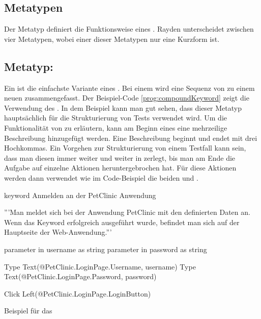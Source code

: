 
\subsection{Metatypen}

Der Metatyp definiert die Funktionsweise eines . Rayden unterscheidet zwischen vier Metatypen, wobei einer dieser Metatypen nur eine Kurzform ist.


\subsection{Metatyp: }

Ein  ist die einfachste Variante eines . Bei einem  wird eine Sequenz von  zu einem neuen  zusammengefasst. Der Beispiel-Code \ref{prog:compoundKeyword} zeigt die Verwendung des  . In dem Beispiel kann man gut sehen, dass dieser Metatyp hauptsächlich für die Strukturierung von Tests verwendet wird. Um die Funktionalität von  zu erläutern, kann am Beginn eines  eine mehrzeilige Beschreibung hinzugefügt werden. Eine Beschreibung beginnt und endet mit drei Hochkommas. Ein Vorgehen zur Strukturierung von einem Testfall kann sein, dass man diesen immer weiter und weiter in  zerlegt, bis man am Ende die Aufgabe auf einzelne Aktionen heruntergebrochen hat. Für diese Aktionen werden dann  verwendet wie im Code-Beispiel die beiden   und .

\begin{program}
\begin{JavaCode}
keyword Anmelden an der PetClinic Anwendung {
	'''Man meldet sich bei der Anwendung PetClinic mit den definierten 
	   Daten an. Wenn das Keyword erfolgreich ausgeführt wurde, 
	   befindet man sich auf der Hauptseite der Web-Anwendung.'''
	
	parameter in username as string
	parameter in password as string
	
	Type Text(@PetClinic.LoginPage.Username, username)
	Type Text(@PetClinic.LoginPage.Password, password)
	
	Click Left(@PetClinic.LoginPage.LoginButton)
}
\end{JavaCode}
\caption{Beispiel für das  }
\label{prog:compoundKeyword}
\end{program}

